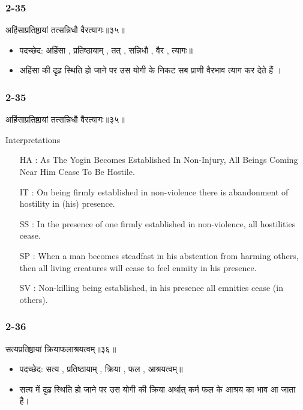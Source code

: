 \begin{frame}[fragile]\frametitle{2-35}
\begin{sanskrit}
अहिंसाप्रतिष्ठायां तत्सन्निधौ वैरत्यागः॥३५॥
\end{sanskrit}

\begin{itemize}
\item पदच्छेद: अहिंसा , प्रतिष्ठायाम् , तत् , सन्निधौ , वैर , त्यागः॥
\item अहिंसा की दृढ़ स्थिति हो जाने पर उस योगी के निकट सब प्राणी वैरभाव त्याग कर देते हैं ।
\end{itemize}	
	
\end{frame}


\begin{frame}[fragile]\frametitle{2-35}
\begin{sanskrit}
अहिंसाप्रतिष्ठायां तत्सन्निधौ वैरत्यागः॥३५॥
\end{sanskrit}

Interpretations
\begin{itemize}
\item [HA]: As The Yogin Becomes Established In Non-Injury, All Beings Coming Near Him Cease To Be Hostile.
\item [IT]: On being firmly established in non-violence there is abandonment of hostility in (his) presence.
\item [SS]: In the presence of one firmly established in non-violence, all hostilities cease.
\item [SP]: When a man becomes steadfast in his abstention from harming others, then all living creatures will cease to feel enmity in his presence.
\item [SV]: Non-killing being established, in his presence all emnities cease (in others). 
\end{itemize}
\end{frame}

\begin{frame}[fragile]\frametitle{2-36}
\begin{sanskrit}
सत्यप्रतिष्ठायां क्रियाफलाश्रयत्वम्॥३६॥
\end{sanskrit}

\begin{itemize}
\item पदच्छेद: सत्य , प्रतिष्ठायाम् , क्रिया , फल , आश्रयत्वम्॥
\item सत्य में दृढ़ स्थिति हो जाने पर उस योगी की क्रिया अर्थात् कर्म फल के आश्रय का भाव आ जाता है।
\end{itemize}	
	
\end{frame}

